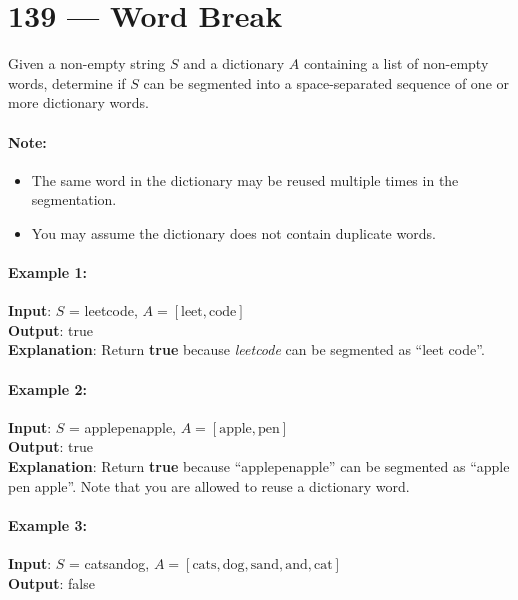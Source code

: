\section{139 --- Word Break}
Given a non-empty string $S$ and a dictionary $A$ containing a list of non-empty words, determine if $S$ can be segmented into a space-separated sequence of one or more dictionary words.
\par
\paragraph{Note:}
\begin{itemize}
\item The same word in the dictionary may be reused multiple times in the segmentation.
\item You may assume the dictionary does not contain duplicate words.
\end{itemize}
\paragraph{Example 1:}
\begin{flushleft}
\textbf{Input}: $S$ = leetcode, $A = [\text{leet}, \text{code}]$
\\
\textbf{Output}: true
\\
\textbf{Explanation}: Return \textbf{true} because \textit{leetcode} can be segmented as ``leet code''.
\end{flushleft}
\paragraph{Example 2:}
\begin{flushleft}
\textbf{Input}: $S$ = applepenapple, $A = [\text{apple}, \text{pen}]$
\\
\textbf{Output}: true
\\
\textbf{Explanation}: Return \textbf{true} because ``applepenapple'' can be segmented as ``apple pen apple''. Note that you are allowed to reuse a dictionary word.
\end{flushleft}
\paragraph{Example 3:}
\begin{flushleft}
\textbf{Input}: $S$ = catsandog, $A = [\text{cats}, \text{dog}, \text{sand}, \text{and}, \text{cat}]$
\\
\textbf{Output}: false
\end{flushleft}
